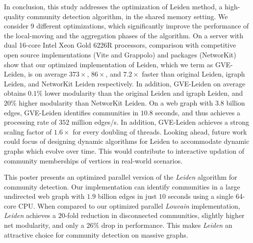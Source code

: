 In conclusion, this study addresses the optimization of Leiden method, a high-quality community detection algorithm, in the shared memory setting. We consider 9 different optimizations, which significantly improve the performance of the local-moving and the aggregation phases of the algorithm. On a server with dual 16-core Intel Xeon Gold 6226R processors, comparison with competitive open source implementations (Vite and Grappolo) and packages (NetworKit) show that our optimized implementation of Leiden, which we term as GVE-Leiden, is on average $373\times$, $86\times$, and $7.2\times$ faster than original Leiden, igraph Leiden, and NetworKit Leiden respectively. In addition, GVE-Leiden on average obtains $0.1\%$ lower modularity than the original Leiden and igraph Leiden, and $20\%$ higher modularity than NetworKit Leiden. On a web graph with $3.8$ billion edges, GVE-Leiden identifies communities in $10.8$ seconds, and thus achieves a processing rate of $352$ million edges/s. In addition, GVE-Leiden achieves a strong scaling factor of $1.6\times$ for every doubling of threads. Looking ahead, future work could focus of designing dynamic algorithms for Leiden to accommodate dynamic graphs which evolve over time. This would contribute to interactive updation of community memberships of vertices in real-world scenarios.

This poster presents an optimized parallel version of the \textit{Leiden} algorithm for community detection. Our implementation can identify communities in a large undirected web graph with $1.9$ billion edges in just $10$ seconds using a single 64-core CPU. When compared to our optimized parallel \textit{Louvain} implementation, \textit{Leiden} achieves a $20$-fold reduction in disconnected communities, slightly higher net modularity, and only a $26\%$ drop in performance. This makes \textit{Leiden} an attractive choice for community detection on massive graphs.
